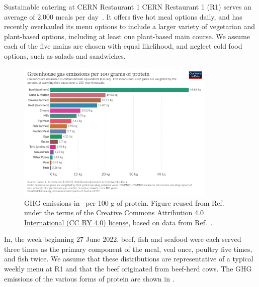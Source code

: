 \documentclass[../SustainableHEP.tex]{subfiles}
\begin{document}
\begin{casestudy}{Sustainable catering at CERN Restaurant 1}%
    CERN Restaurant 1 (R1) serves an average of 2,000 meals per day~\cite{CERNACCUMeeting}. It offers five hot meal options daily, and has recently overhauled its menu options to include a larger variety of vegetarian and plant-based options, including at least one plant-based main course.  We assume each of the five mains are chosen with equal likelihood, and neglect cold food options, such as salads and sandwiches.

    \begin{figure}
        \captionsetup{type=figure}
        \includegraphics[width=0.85\textwidth]{Sections/Figs/Food/Emissions-protein.png}
        \caption[GHG emissions per 100 g of protein]{GHG emissions in \CdOe\ per 100 g of protein. Figure reused from Ref.~\cite{OWID-Food} under the terms of the \href{https://creativecommons.org/licenses/by/4.0/}{Creative Commons Attribution 4.0 International (CC BY 4.0) license}, based on data from Ref.~\cite{PooreNemecek2018}.}
        \label{fig:ghg-per-protein}
    \end{figure}

    In, \eg the week beginning 27 June 2022, beef, fish and seafood were each served three times as the primary component of the meal, veal once, poultry five times, and fish twice.  We assume that these distributions are representative of a typical weekly menu at R1 and that the beef originated from beef-herd cows. The GHG emissions of the various forms of protein are shown in .


\end{casestudy}
\end{document}
